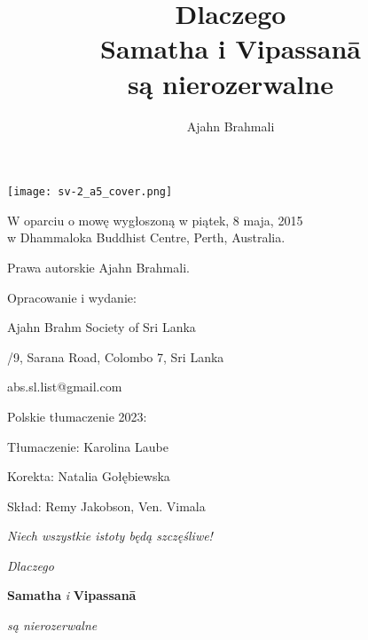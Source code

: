 \documentclass[12pt,openany]{book}
\title{ Dlaczego \protect\\ Samatha i Vipassanā \protect\\ są nierozerwalne}
\author{Ajahn Brahmali}
\date{}
\begin{document}
\frontmatter
\pagestyle{empty}

\hspace*{-156mm}
\texttt{[image: sv-2\_a5\_cover.png]}





\restoregeometry

\begin{center}\end{center}

\vspace{4em}
{\small
\noindent W oparciu o mowę wygłoszoną w piątek, 8 maja, 2015 \\w Dhammaloka Buddhist Centre, Perth, Australia.

\bigskip

\noindent Prawa autorskie Ajahn Brahmali.
\bigskip

\noindent Opracowanie i wydanie:

\medskip

\noindent Ajahn Brahm Society of Sri Lanka

/9, Sarana Road, Colombo 7, Sri Lanka

\noindent abs.sl.list@gmail.com

\bigskip

\noindent Polskie tłumaczenie 2023:

\medskip

\noindent Tłumaczenie: Karolina Laube

\noindent Korekta: Natalia Gołębiewska

\noindent Skład: Remy Jakobson, Ven. Vimala

}

\vfill

\begin{center}
\textit{ Niech wszystkie istoty będą szczęśliwe!}

\end{center}
\vfill

\newpage

\begin{center}\end{center}
\begin{center}

\vfill

{\huge \textit{Dlaczego} 

\medskip

\textbf{Samatha} \textit{i} \textbf{Vipassanā} 

\bigskip

\textit{są nierozerwalne}}

\vfill


\vfill
\end{center}
\end{document}
